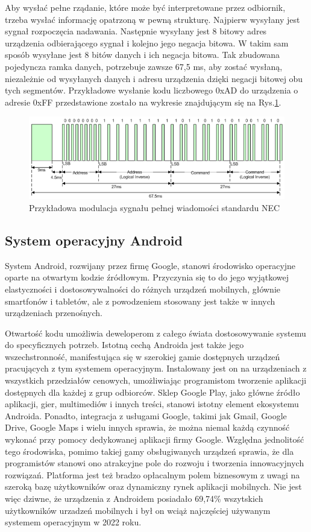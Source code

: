 \documentclass[12pt,twoside,draft]{article}
\begin{document}
Aby wysłać pełne rządanie, które może być interpretowane przez odbiornik, trzeba wysłać informację opatrzoną w pewną strukturę. Najpierw wysyłany jest sygnał rozpoczęcia nadawania. Następnie wysyłany jest 8 bitowy adres urządzenia odbierającego sygnał i kolejno jego negacja bitowa. W takim sam sposób wysyłane jest 8 bitów danych i ich negacja bitowa. Tak zbudowana pojedyncza ramka danych, potrzebuje zawsze 67,5 ms, aby zostać wysłaną, niezależnie od wysyłanych danych i adresu urządzenia dzięki negacji bitowej obu tych segmentów. Przykładowe wysłanie kodu liczbowego 0xAD do urządzenia o adresie 0xFF przedstawione zostało na wykresie znajdującym się na Rys.\ref*{Fig:necFrame}.

\begin{figure}[ht]
   \centering
   \includegraphics[width=13cm]{images/necFrame.png}
   \caption{Przykładowa modulacja sygnału pełnej wiadomości standardu NEC}
   \label{Fig:necFrame}
\end{figure}

\subsection{System operacyjny Android}
System Android, rozwijany przez firmę Google, stanowi środowisko operacyjne oparte na otwartym kodzie źródłowym. Przyczynia się to do jego wyjątkowej elastyczności i dostosowywalności do różnych urządzeń mobilnych, głównie
smartfonów i tabletów, ale z powodzeniem stosowany jest także w innych urządzeniach przenośnych.

Otwartość kodu umożliwia deweloperom z całego świata dostosowywanie systemu do specyficznych potrzeb. Istotną cechą Androida jest także jego wszechstronność, manifestująca się w szerokiej gamie dostępnych
urządzeń pracujących z tym systemem operacyjnym.
Instalowany jest on na urządzeniach z wszystkich przedziałów cenowych, umożliwiając
programistom tworzenie aplikacji dostępnych dla każdej z grup odbiorców. Sklep Google Play, jako główne źródło
aplikacji, gier, multimediów i innych treści, stanowi istotny element ekosystemu Androida. Ponadto, integracja
z usługami Google, takimi jak Gmail, Google Drive, Google Maps i wielu innych sprawia, że można niemal każdą czynność wykonać przy pomocy dedykowanej aplikacji firmy Google. Względna jednolitość tego środowiska, pomimo takiej gamy obsługiwanych urządzeń sprawia, że dla programistów stanowi ono atrakcyjne pole do
rozwoju i tworzenia innowacyjnych rozwiązań. Platforma jest też bradzo opłacalnym polem biznesowym z uwagi na szeroką bazę użytkowników oraz dynamiczny rynek aplikacji mobilnych. Nie jest więc dziwne, że urządzenia z Androidem posiadało 69,74\% wszytskich użytkowników urzadzeń mobilnych i był on wciąż najczęściej używanym systemem operacyjnym w 2022 roku\cite{androidStats}.
\end{document}
